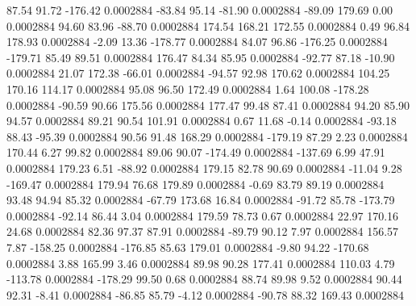        87.54       91.72     -176.42     0.0002884
      -83.84       95.14      -81.90     0.0002884
      -89.09      179.69        0.00     0.0002884
       94.60       83.96      -88.70     0.0002884
      174.54      168.21      172.55     0.0002884
        0.49       96.84      178.93     0.0002884
       -2.09       13.36     -178.77     0.0002884
       84.07       96.86     -176.25     0.0002884
     -179.71       85.49       89.51     0.0002884
      176.47       84.34       85.95     0.0002884
      -92.77       87.18      -10.90     0.0002884
       21.07      172.38      -66.01     0.0002884
      -94.57       92.98      170.62     0.0002884
      104.25      170.16      114.17     0.0002884
       95.08       96.50      172.49     0.0002884
        1.64      100.08     -178.28     0.0002884
      -90.59       90.66      175.56     0.0002884
      177.47       99.48       87.41     0.0002884
       94.20       85.90       94.57     0.0002884
       89.21       90.54      101.91     0.0002884
        0.67       11.68       -0.14     0.0002884
      -93.18       88.43      -95.39     0.0002884
       90.56       91.48      168.29     0.0002884
     -179.19       87.29        2.23     0.0002884
      170.44        6.27       99.82     0.0002884
       89.06       90.07     -174.49     0.0002884
     -137.69        6.99       47.91     0.0002884
      179.23        6.51      -88.92     0.0002884
      179.15       82.78       90.69     0.0002884
      -11.04        9.28     -169.47     0.0002884
      179.94       76.68      179.89     0.0002884
       -0.69       83.79       89.19     0.0002884
       93.48       94.94       85.32     0.0002884
      -67.79      173.68       16.84     0.0002884
      -91.72       85.78     -173.79     0.0002884
      -92.14       86.44        3.04     0.0002884
      179.59       78.73        0.67     0.0002884
       22.97      170.16       24.68     0.0002884
       82.36       97.37       87.91     0.0002884
      -89.79       90.12        7.97     0.0002884
      156.57        7.87     -158.25     0.0002884
     -176.85       85.63      179.01     0.0002884
       -9.80       94.22     -170.68     0.0002884
        3.88      165.99        3.46     0.0002884
       89.98       90.28      177.41     0.0002884
      110.03        4.79     -113.78     0.0002884
     -178.29       99.50        0.68     0.0002884
       88.74       89.98        9.52     0.0002884
       90.44       92.31       -8.41     0.0002884
      -86.85       85.79       -4.12     0.0002884
      -90.78       88.32      169.43     0.0002884
